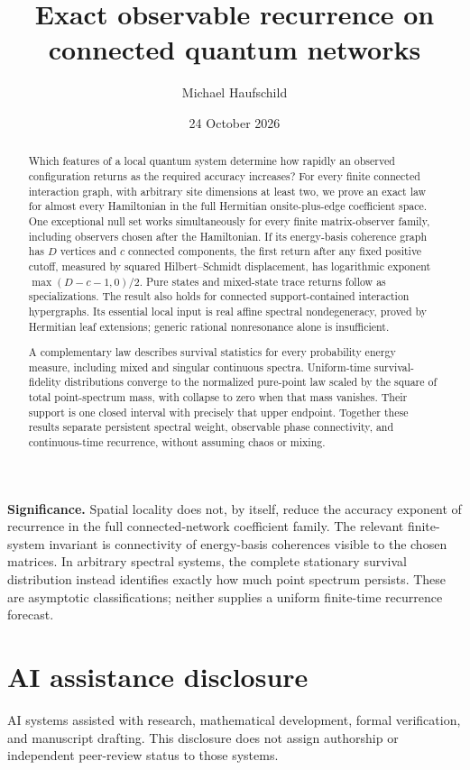 \documentclass[10pt]{article}
\title{\textbf{Exact observable recurrence on connected quantum networks}}
\author{Michael Haufschild}
\date{24 October 2026}
\theoremstyle{definition}
\begin{document}
\maketitle
\begin{abstract}
Which features of a local quantum system determine how rapidly an observed
configuration returns as the required accuracy increases?
For every finite connected interaction graph, with arbitrary site dimensions
at least two, we prove an exact law for almost every Hamiltonian in the full
Hermitian onsite-plus-edge coefficient space. One exceptional null set works
simultaneously for every finite matrix-observer family, including observers
chosen after the Hamiltonian. If its energy-basis coherence graph has $D$
vertices and $c$ connected components, the first return after any fixed
positive cutoff, measured by squared Hilbert--Schmidt displacement, has
logarithmic exponent $\max(D-c-1,0)/2$. Pure states and mixed-state trace
returns follow as specializations. The result also holds for connected
support-contained interaction hypergraphs. Its essential local input is
real affine spectral nondegeneracy, proved by Hermitian leaf extensions;
generic rational nonresonance alone is insufficient.

A complementary law describes survival statistics for every probability
energy measure, including mixed and singular continuous spectra. Uniform-time
survival-fidelity distributions converge to the normalized pure-point law
scaled by the square of total point-spectrum mass, with collapse to zero
when that mass vanishes. Their support is one
closed interval with precisely that upper endpoint. Together these results
separate persistent spectral weight, observable phase connectivity, and
continuous-time recurrence, without assuming chaos or mixing.
\end{abstract}

\noindent\textbf{Significance.}
Spatial locality does not, by itself, reduce the accuracy exponent of
recurrence in the full connected-network coefficient family. The relevant
finite-system invariant is connectivity of energy-basis coherences visible
to the chosen matrices. In arbitrary spectral systems, the complete
stationary survival distribution instead identifies exactly how much
point spectrum persists. These are asymptotic classifications; neither
supplies a uniform finite-time recurrence forecast.


\section*{AI assistance disclosure}
AI systems assisted with research, mathematical development, formal
verification, and manuscript drafting. This disclosure does not assign
authorship or independent peer-review status to those systems.


\end{document}
